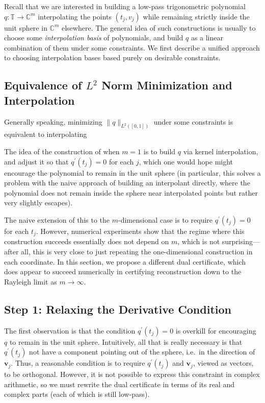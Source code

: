 \documentclass[11pt]{article}
\newcommand{\TT}{\mathbb{T}}
\newcommand{\CC}{\mathbb{C}}
\newcommand{\bv}{\bm v}
\begin{document}
Recall that we are interested in building a low-pass trigonometric polynomial $q: \TT \to \CC^m$ interpolating the points $(t_j, v_j)$ while remaining strictly inside the unit sphere in $\CC^m$ elsewhere.
The general idea of such constructions is usually to choose some \emph{interpolation basis} of polynomials, and build $q$ as a linear combination of them under some constraints.
We first describe a unified approach to choosing interpolation bases based purely on desirable constraints.

\subsection{Equivalence of $L^2$ Norm Minimization and Interpolation}

Generally speaking, minimizing $\|q\|_{L^2([0, 1])}$ under some constraints is equivalent to interpolating



The idea of the construction of \cite{fernandez2016super} when $m = 1$ is to build $q$ via kernel interpolation, and adjust it so that $q^\prime(t_j) = 0$ for each $j$, which one would hope might encourage the polynomial to remain in the unit sphere (in particular, this solves a problem with the naive approach of building an interpolant directly, where the polynomial does not remain inside the sphere near interpolated points but rather very slightly escapes).

The naive extension of this to the $m$-dimensional case is to require $q^\prime(t_j) = 0$ for each $t_j$.
However, numerical experiments show that the regime where this construction succeeds essentially does not depend on $m$, which is not surprising---after all, this is very close to just repeating the one-dimensional construction in each coordinate.
In this section, we propose a different dual certificate, which does appear to succeed numerically in certifying reconstruction down to the Rayleigh limit as $m \to \infty$.

\subsection{Step 1: Relaxing the Derivative Condition}

The first observation is that the condition $q^\prime(t_j) = 0$ is overkill for encouraging $q$ to remain in the unit sphere.
Intuitively, all that is really necessary is that $q^\prime(t_j)$ not have a component pointing out of the sphere, i.e.\ in the direction of $\bv_j$.
Thus, a reasonable condition is to require $q^\prime(t_j)$ and $\bv_j$, viewed as vectors, to be orthogonal.
However, it is not possible to express this constraint in complex arithmetic, so we must rewrite the dual certificate in terms of its real and complex parts (each of which is still low-pass).
\end{document}
